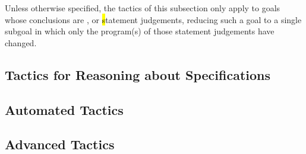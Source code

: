 Unless otherwise specified, the tactics of this subsection only apply
to goals whose conclusions are \prhl, \phl or \hl statement
judgements, reducing such a goal to a single subgoal in which only the
program(s) of those statement judgements have changed.















\subsection{Tactics for Reasoning about Specifications}














\subsection{Automated Tactics}
\label{subsec:automatedtactics}




\subsection{Advanced Tactics}
\label{subsec:advancedtactics}




